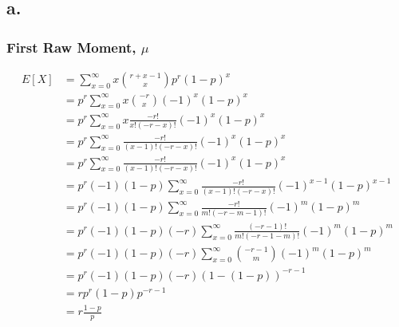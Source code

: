 \documentclass[12pt]{article}
\begin{document}
\subsection*{a.}

\subsubsection*{First Raw Moment, $\mu$}
\begin{align*}
  E[X] &= \sum_{x=0}^\infty x\binom{r+x-1}{x}p^r (1-p)^x \\
  &= p^r \sum_{x=0}^\infty x\binom{-r}{x}(-1)^x(1-p)^x \\
  &= p^r \sum_{x=0}^\infty x\frac{-r!}{x!(-r-x)!}(-1)^x(1-p)^x \\
  &= p^r \sum_{x=0}^\infty \frac{-r!}{(x-1)!(-r-x)!}(-1)^x(1-p)^x \\
  &= p^r \sum_{x=0}^\infty \frac{-r!}{(x-1)!(-r-x)!}(-1)^x(1-p)^x \\
  &= p^r(-1)(1-p) \sum_{x=0}^\infty \frac{-r!}{(x-1)!(-r-x)!}(-1)^{x-1}(1-p)^{x-1} \\
  &= p^r(-1)(1-p) \sum_{x=0}^\infty \frac{-r!}{m!(-r-m-1)!}(-1)^{m}(1-p)^{m} \\
  &= p^r(-1)(1-p)(-r) \sum_{x=0}^\infty \frac{(-r-1)!}{m!(-r-1-m)!}(-1)^{m}(1-p)^{m} \\
  &= p^r(-1)(1-p)(-r) \sum_{x=0}^\infty \binom{-r-1}{m}(-1)^{m}(1-p)^{m} \\
  &= p^r(-1)(1-p)(-r)(1-(1-p))^{-r-1} \\
  &= rp^r(1-p)p^{-r-1} \\
  &= r\frac{1-p}{p} \\
\end{align*}
\end{document}
